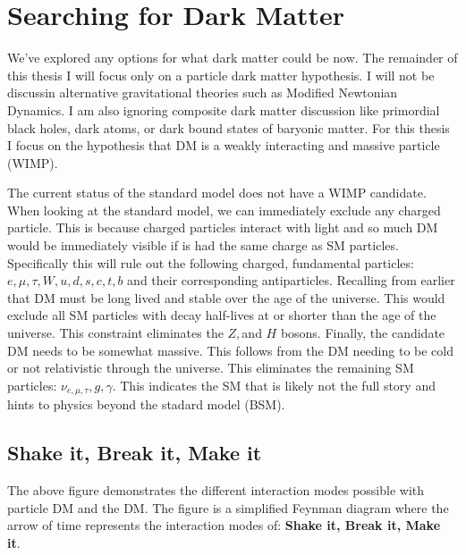 \section{Searching for Dark Matter\label{dm_search}}
We've explored any options for what dark matter could be now.
The remainder of this thesis I will focus only on a particle dark matter hypothesis.
I will not be discussin alternative gravitational theories such as Modified Newtonian Dynamics.
I am also ignoring composite dark matter discussion like primordial black holes, dark atoms, or dark bound states of baryonic matter.
For this thesis I focus on the hypothesis that DM is a weakly interacting and massive particle (WIMP).


The current status of the standard model does not have a WIMP candidate.
When looking at the standard model, we can immediately exclude any charged particle.
This is because charged particles interact with light and so much DM would be immediately visible if is had the same charge as SM particles.
Specifically this will rule out the following charged, fundamental particles: $e,\mu, \tau, W, u, d, s, c, t, b$ and their corresponding antiparticles.
Recalling from earlier that DM must be long lived and stable over the age of the universe.
This would exclude all SM particles with decay half-lives at or shorter than the age of the universe.
This constraint eliminates the $Z, $and $H$ bosons.
Finally, the candidate DM needs to be somewhat massive.
This follows from the DM needing to be cold or not relativistic through the universe.
This eliminates the remaining SM particles: $\nu_{e, \mu, \tau}, g, \gamma$.
This indicates the SM that is likely not the full story and hints to physics beyond the stadard model (BSM).


\subsection{Shake it, Break it, Make it\label{sec:bop_it}}


The above figure demonstrates the different interaction modes possible with particle DM and the DM.
The figure is a simplified Feynman diagram where the arrow of time represents the interaction modes of: \textbf{Shake it, Break it, Make it}.


